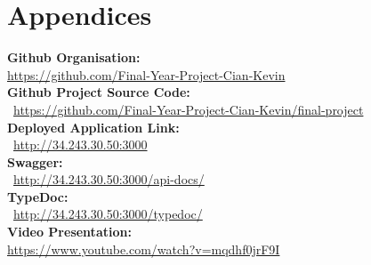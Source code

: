 \chapter{Appendices}

\textbf{Github Organisation: }\\ \noindent\textcolor{NavyBlue}{\url{https://github.com/Final-Year-Project-Cian-Kevin}}\\

\noindent\textbf{Github Project Source Code: }\\\ \noindent\textcolor{NavyBlue}{\url{https://github.com/Final-Year-Project-Cian-Kevin/final-project}}\\

\noindent\textbf{Deployed Application Link: }\\\ \noindent\textcolor{NavyBlue}{\url{http://34.243.30.50:3000}}\\

\noindent\textbf{Swagger: }\\\ \noindent\textcolor{NavyBlue}{\url{http://34.243.30.50:3000/api-docs/}}\\

\noindent\textbf{TypeDoc: }\\\ \noindent\textcolor{NavyBlue}{\url{http://34.243.30.50:3000/typedoc/}}\\

\noindent\textbf{Video Presentation: }\\ \noindent\textcolor{NavyBlue}{\url{https://www.youtube.com/watch?v=mqdhf0jrF9I}}